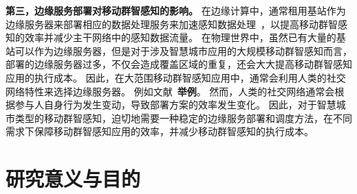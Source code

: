 


\textbf{第三，边缘服务部署对移动群智感知的影响。}
在边缘计算中，通常租用基站作为边缘服务器来部署相应的数据处理服务来加速感知数据处理~\cite{}，以提高移动群智感知的效率并减少主干网络中的感知数据流量。
在物理世界中，虽然已有大量的基站可以作为边缘服务器，但是对于涉及智慧城市应用的大规模移动群智感知而言，部署的边缘服务器过多，不仅会造成覆盖区域的重复，还会大大提高移动群智感知应用的执行成本。
因此，在大范围移动群智感知应用中，通常会利用人类的社交网络特性来选择边缘服务器。
例如文献~\cite{}\textbf{举例}。
然而，人类的社交网络通常会根据参与人自身行为发生变动，导致部署方案的效率发生变化。
因此，对于智慧城市类型的移动群智感知，迫切地需要一种稳定的边缘服务部署和调度方法，在不同需求下保障移动群智感知应用的效率，并减少移动群智感知的执行成本。


\section{研究意义与目的}

